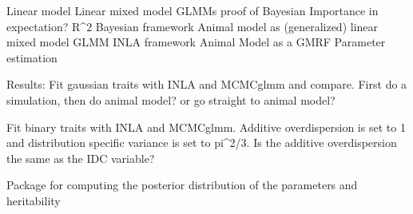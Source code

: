Linear model
Linear mixed model
GLMMs
proof of Bayesian Importance in expectation?
R^2
Bayesian framework
Animal model as (generalized) linear mixed model
GLMM 
INLA framework
Animal Model as a GMRF
Parameter estimation




Results:
Fit gaussian traits with INLA and MCMCglmm and compare. First do a simulation, then do animal model? or go straight to animal model?


Fit binary traits with INLA and MCMCglmm. Additive overdispersion is set to 1 and distribution specific variance is set to pi^2/3.
Is the additive overdispersion the same as the IDC variable?


Package for computing the posterior distribution of the parameters and heritability
